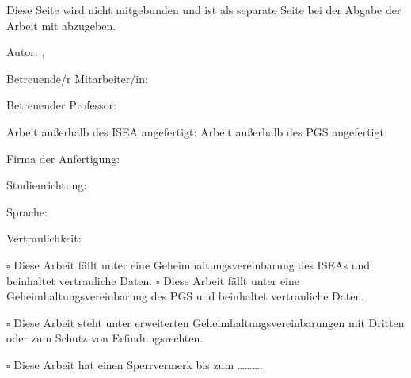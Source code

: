 

\label{SummaryForm}

\thispagestyle{empty}

\small
Diese Seite wird nicht mitgebunden und ist als separate Seite bei der Abgabe der Arbeit mit abzugeben.
\vspace{5mm}

\varTitle
\vspace{5mm}

\varDate
\vspace{5mm}

Autor: \varAuthorFamily{}, \varAuthorGiven{}

Betreuende/r Mitarbeiter/in: \varAssiName

Betreuender Professor: \varSupA

\vspace{5mm}
{
	Arbeit außerhalb des ISEA angefertigt: \textbf{}
}
{
	Arbeit außerhalb des PGS angefertigt: \textbf{}
}

{
	Firma der Anfertigung: \varExternName
}
{}

\vspace{5mm}

Studienrichtung: \varFieldOfStudy

Sprache: 

\vspace{7mm}
Vertraulichkeit:

{
	$\square$ Diese Arbeit fällt unter eine Geheimhaltungsvereinbarung des ISEAs und beinhaltet vertrauliche Daten.
}
{
	$\square$ Diese Arbeit fällt unter eine Geheimhaltungsvereinbarung des PGS und beinhaltet vertrauliche Daten.	
}

$\square$ Diese Arbeit steht unter erweiterten Geheimhaltungsvereinbarungen mit Dritten oder zum Schutz von Erfindungsrechten.

$\square$ Diese Arbeit hat einen Sperrvermerk bis zum \ldots \ldots \ldots .

